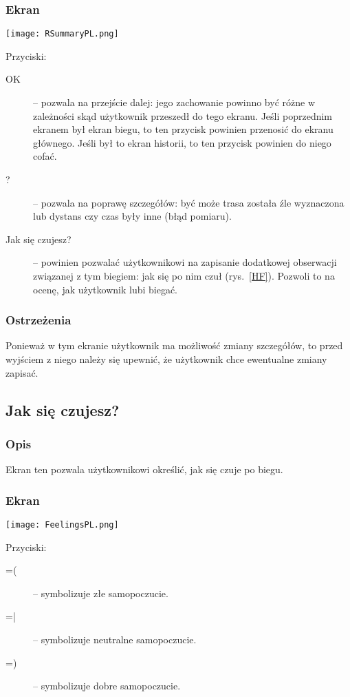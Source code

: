 \subsubsection{Ekran}
\begin{minipage}{0.5\textwidth}
  \label{RS}
  \texttt{[image: RSummaryPL.png]}
\end{minipage}
\begin{minipage}{0.5\textwidth}
Przyciski:\\
\begin{description}
  \item[OK] -- pozwala na przejście dalej: jego zachowanie powinno być różne w zależności skąd użytkownik przeszedł do tego ekranu. Jeśli poprzednim ekranem był ekran biegu, to ten przycisk powinien przenosić do ekranu głównego. Jeśli był to ekran historii, to ten przycisk powinien do niego cofać.
  \item[?] -- pozwala na poprawę szczegółów: być może trasa została źle wyznaczona lub dystans czy czas były inne (błąd pomiaru).
  \item[Jak się czujesz?] -- powinien pozwalać użytkownikowi na zapisanie dodatkowej obserwacji związanej z tym biegiem: jak się po nim czuł (rys.~\ref{HF}). Pozwoli to na ocenę, jak użytkownik lubi biegać.
\end{description}
\end{minipage}
\subsubsection{Ostrzeżenia}
\noindent Ponieważ w tym ekranie użytkownik ma możliwość zmiany szczegółów, to przed wyjściem z niego należy się upewnić, że użytkownik chce ewentualne zmiany zapisać.
\subsection{Jak się czujesz?}
\subsubsection{Opis}
\noindent Ekran ten pozwala użytkownikowi określić, jak się czuje po biegu.
\subsubsection{Ekran}
\begin{minipage}{0.5\textwidth}
  \label{HF}
  \texttt{[image: FeelingsPL.png]}
\end{minipage}
\begin{minipage}{0.5\textwidth}
Przyciski:\\
\begin{description}
  \item[=(] -- symbolizuje złe samopoczucie.
  \item[=|] -- symbolizuje neutralne samopoczucie.
  \item[=)] -- symbolizuje dobre samopoczucie.
\end{description}
\end{minipage}

